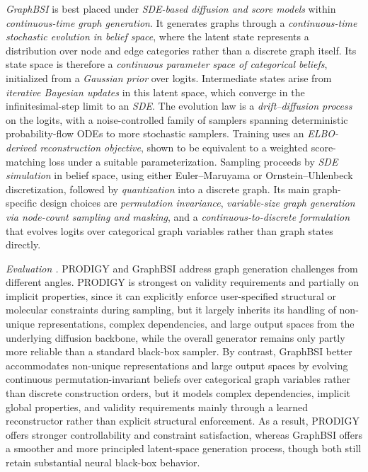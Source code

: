 \documentclass{article}
\begin{document}
\emph{GraphBSI} \cite{song2025smooth} is best placed under \emph{SDE-based diffusion and score models} within \emph{continuous-time graph generation}. It generates graphs through a \emph{continuous-time stochastic evolution in belief space}, where the latent state represents a distribution over node and edge categories rather than a discrete graph itself. Its state space is therefore a \emph{continuous parameter space of categorical beliefs}, initialized from a \emph{Gaussian prior} over logits. Intermediate states arise from \emph{iterative Bayesian updates} in this latent space, which converge in the infinitesimal-step limit to an \emph{SDE}. The evolution law is a \emph{drift--diffusion process} on the logits, with a noise-controlled family of samplers spanning deterministic probability-flow ODEs to more stochastic samplers. Training uses an \emph{ELBO-derived reconstruction objective}, shown to be equivalent to a weighted score-matching loss under a suitable parameterization. Sampling proceeds by \emph{SDE simulation} in belief space, using either Euler--Maruyama or Ornstein--Uhlenbeck discretization, followed by \emph{quantization} into a discrete graph. Its main graph-specific design choices are \emph{permutation invariance}, \emph{variable-size graph generation via node-count sampling and masking}, and a \emph{continuous-to-discrete formulation} that evolves logits over categorical graph variables rather than graph states directly.


\emph{Evaluation .} PRODIGY and GraphBSI address graph generation challenges from different angles. PRODIGY is strongest on validity requirements and partially on implicit properties, since it can explicitly enforce user-specified structural or molecular constraints during sampling, but it largely inherits its handling of non-unique representations, complex dependencies, and large output spaces from the underlying diffusion backbone, while the overall generator remains only partly more reliable than a standard black-box sampler. By contrast, GraphBSI better accommodates non-unique representations and large output spaces by evolving continuous permutation-invariant beliefs over categorical graph variables rather than discrete construction orders, but it models complex dependencies, implicit global properties, and validity requirements mainly through a learned reconstructor rather than explicit structural enforcement. As a result, PRODIGY offers stronger controllability and constraint satisfaction, whereas GraphBSI offers a smoother and more principled latent-space generation process, though both still retain substantial neural black-box behavior.
\end{document}
